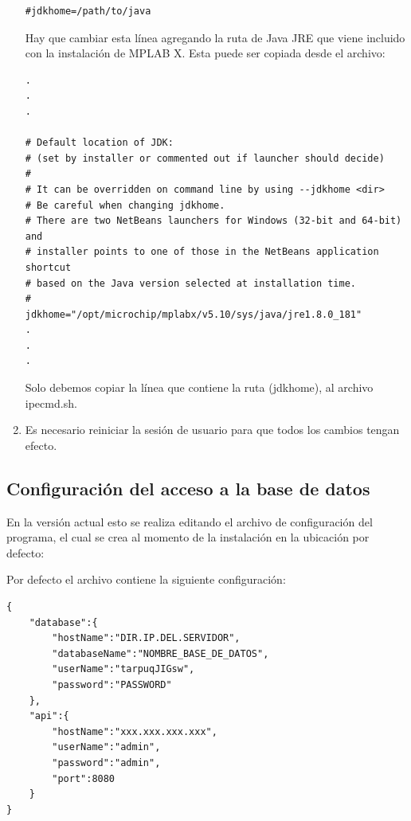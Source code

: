 \documentclass[a4paper,12pt]{refart}
\begin{document}
\begin{enumerate}
\begin{lstlisting}
#jdkhome=/path/to/java
\end{lstlisting}

Hay que cambiar esta línea agregando la ruta de Java JRE que viene incluido con la instalación de MPLAB X. Esta puede ser copiada desde el archivo:
\\

\begin{lstlisting}
.
.
.

# Default location of JDK:
# (set by installer or commented out if launcher should decide)
#
# It can be overridden on command line by using --jdkhome <dir>
# Be careful when changing jdkhome.
# There are two NetBeans launchers for Windows (32-bit and 64-bit) and
# installer points to one of those in the NetBeans application shortcut 
# based on the Java version selected at installation time.
#
jdkhome="/opt/microchip/mplabx/v5.10/sys/java/jre1.8.0_181"
.
.
.
\end{lstlisting}

Solo debemos copiar la línea que contiene la ruta (jdkhome), al archivo ipecmd.sh.

\item Es necesario reiniciar la sesión de usuario para que todos los cambios tengan efecto.
 
\end{enumerate}

\subsection{Configuración del acceso a la base de datos}
En la versión actual esto se realiza editando el archivo de configuración del programa, el cual se crea al momento de la instalación en la ubicación por defecto:
\\

Por defecto el archivo contiene la siguiente configuración:
\begin{lstlisting}
{
    "database":{
        "hostName":"DIR.IP.DEL.SERVIDOR",
        "databaseName":"NOMBRE_BASE_DE_DATOS",
        "userName":"tarpuqJIGsw",
        "password":"PASSWORD"
    },
    "api":{
        "hostName":"xxx.xxx.xxx.xxx",
        "userName":"admin",
        "password":"admin",
        "port":8080
    }
}
\end{lstlisting}
\end{document}
